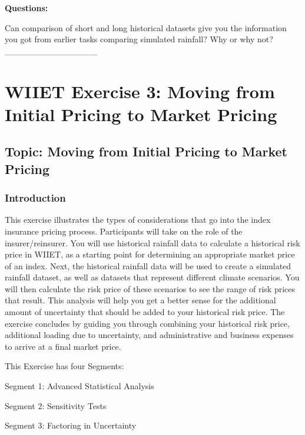 \documentclass[letterpaper,10pt,english]{sphinxmanual}
\begin{document}
\textbf{Questions:}

Can comparison of short and long historical datasets give you the information you got from earlier tasks comparing simulated rainfall? Why or why not? \_\_\_\_\_\_\_\_\_\_\_\_\_\_\_


\section{WIIET Exercise 3: Moving from Initial Pricing to Market Pricing}
\label{wiiet/wiiet_initialtomarketpricing_Web:wiiet-exercise-3-moving-from-initial-pricing-to-market-pricing}\label{wiiet/wiiet_initialtomarketpricing_Web::doc}

\subsection{Topic: Moving from Initial Pricing to Market Pricing}
\label{wiiet/wiiet_initialtomarketpricing_Web:topic-moving-from-initial-pricing-to-market-pricing}

\subsubsection{Introduction}
\label{wiiet/wiiet_initialtomarketpricing_Web:introduction}
This exercise illustrates the types of considerations that go into the index insurance pricing process. Participants will take on the role of the insurer/reinsurer. You will use historical rainfall data to calculate a historical risk price in WIIET, as a starting point for determining an appropriate market price of an index. Next, the historical rainfall data will be used to create a simulated rainfall dataset, as well as datasets that represent different climate scenarios. You will then calculate the risk price of these scenarios to see the range of risk prices that result. This analysis will help you get a better sense for the additional amount of uncertainty that should be added to your historical risk price. The exercise concludes by guiding you through combining your historical risk price, additional loading due to uncertainty, and administrative and business expenses to arrive at a final market price.

This Exercise has four Segments:

Segment 1: Advanced Statistical Analysis

Segment 2: Sensitivity Tests

Segment 3: Factoring in Uncertainty
\end{document}
